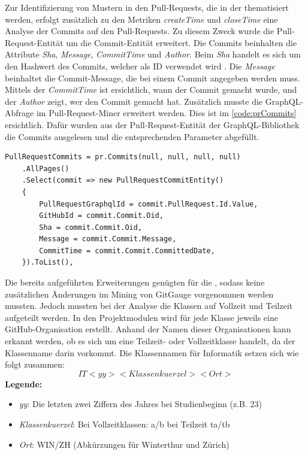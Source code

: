 Zur Identifizierung von Mustern in den Pull-Requests, die in der  thematisiert werden, erfolgt zusätzlich zu den Metriken \textit{createTime} und \textit{closeTime} eine Analyse der Commits auf den Pull-Requests. Zu diesem Zweck wurde die Pull-Request-Entität um die Commit-Entität erweitert. Die Commits beinhalten die Attribute \textit{Sha}, \textit{Message}, \textit{CommitTime} und \textit{Author}. Beim \textit{Sha} handelt es sich um den Hashwert des Commits, welcher als ID verwendet wird \parencite{noauthor_git_nodate}. Die \textit{Message} beinhaltet die Commit-Message, die bei einem Commit angegeben werden muss. Mittels der \textit{CommitTime} ist ersichtlich, wann der Commit gemacht wurde, und der \textit{Author} zeigt, wer den Commit gemacht hat. Zusätzlich musste die GraphQL-Abfrage im Pull-Request-Miner erweitert werden. Dies ist im \autoref{code:prCommits} ersichtlich. Dafür wurden aus der Pull-Request-Entität der GraphQL-Bibliothek die Commits ausgelesen und die entsprechenden Parameter abgefüllt.
\begin{lstlisting}[language=CSharp, caption={GraphQL-Abfrage Pull-Request Commits}, label={code:prCommits}]
PullRequestCommits = pr.Commits(null, null, null, null)
    .AllPages()
    .Select(commit => new PullRequestCommitEntity()
    {
        PullRequestGraphqlId = commit.PullRequest.Id.Value,
        GitHubId = commit.Commit.Oid,
        Sha = commit.Commit.Oid,
        Message = commit.Commit.Message,
        CommitTime = commit.Commit.CommittedDate,
    }).ToList(),
\end{lstlisting}

\newpage
Die bereits aufgeführten Erweiterungen genügten für die , sodass keine zusätzlichen Änderungen im Mining von GitGauge vorgenommen werden mussten. Jedoch mussten bei der Analyse die Klassen auf Vollzeit und Teilzeit aufgeteilt werden. In den Projektmodulen wird für jede Klasse jeweils eine GitHub-Organisation erstellt. Anhand der Namen dieser Organisationen kann erkannt werden, ob es sich um eine Teilzeit- oder Vollzeitklasse handelt, da der Klassenname darin vorkommt. Die Klassennamen für Informatik setzen sich wie folgt zusammen: 
\begin{equation}
IT<yy><Klassenkuerzel><Ort>
\end{equation}
\noindent\textbf{Legende:}
\begin{itemize}
  \item \textit{yy}: Die letzten zwei Ziffern des Jahres bei Studienbeginn (z.B. 23)
  \item\textit{Klassenkuerzel}: Bei Vollzeitklassen: a/b bei Teilzeit ta/tb
  \item\textit{Ort}: WIN/ZH (Abkürzungen für Winterthur und Zürich)
\end{itemize}

